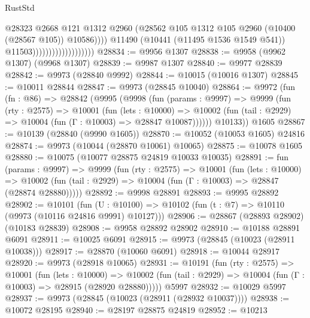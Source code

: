 \begin{lexlean}{RustStd}
\begin{coremodule}
                                                @28323
                                                @2668
                                                @121
                                                @1312
                                                @2960
                                                (@28562
                                                  @105
                                                  @1312
                                                  @105
                                                  @2960
                                                  (@10400 (@28567 @105))
                                                  @10586))))
                                          @11490
                                          (@10441 (@11495 @1536 @1549 @541))
                                          @11503)))))))))))))))))))
@28834 := @9956 @1307
@28838 := @9958 (@9962 @1307) (@9968 @1307)
@28839 := @9987 @1307
@28840 := @9977 @28839
@28842 := @9973 (@28840 @9992)
@28844 := @10015 (@10016 @1307)
@28845 := @10011 @28844
@28847 := @9973 (@28845 @10040)
@28864 := @9972
    (fun (fn : @86) =>
    @28842
      (@9995
        (@9998
          (fun (params : @9997) =>
          @9999
            (fun (rty : @2575) =>
            @10001
              (fun (lets : @10000) =>
              @10002 (fun (tail : @2929) => @10004 (fun (Γ : @10003) => @28847 @10087))))))
        @10133))
    @1605
@28867 := @10139 (@28840 (@9990 @1605))
@28870 := @10052 (@10053 @1605) @24816
@28874 := @9973 (@10044 (@28870 @10061) @10065)
@28875 := @10078 @1605
@28880 := @10075 (@10077 @28875 @24819 @10033 @10035)
@28891 := fun (params : @9997) =>
  @9999
    (fun (rty : @2575) =>
    @10001
      (fun (lets : @10000) =>
      @10002 (fun (tail : @2929) => @10004 (fun (Γ : @10003) => @28847 (@28874 @28880)))))
@28892 := @9998 @28891
@28893 := @9995 @28892
@28902 := @10101
    (fun (U : @10100) => @10102 (fun (t : @7) => @10110 (@9973 (@10116 @24816 @9991) @10127)))
@28906 := @28867 (@28893 @28902) (@10183 @28839)
@28908 := @9958 @28892 @28902
@28910 := @10188 @28891 @6091
@28911 := @10025 @6091
@28915 := @9973 (@28845 (@10023 (@28911 @10038)))
@28917 := @28870 (@10060 @6091)
@28918 := @10044 @28917
@28920 := @9973 (@28918 @10065)
@28931 := @10191
    (fun (rty : @2575) =>
    @10001
      (fun (lets : @10000) =>
      @10002 (fun (tail : @2929) => @10004 (fun (Γ : @10003) => @28915 (@28920 @28880)))))
    @5997
@28932 := @10029 @5997
@28937 := @9973 (@28845 (@10023 (@28911 (@28932 @10037))))
@28938 := @10072 @28195
@28940 := @28197 @28875 @24819
@28952 := @10213

\end{coremodule}
\end{lexlean}
